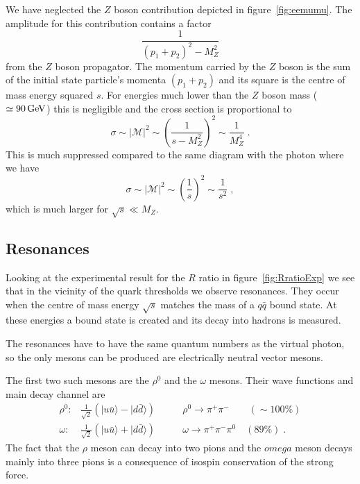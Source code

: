 \documentclass[12pt]{article}
\begin{document}
We have neglected the $Z$ boson contribution depicted in figure~\ref{fig:eemumu}. The amplitude for this contribution contains a factor
\[\frac{1}{(p_1+p_2)^2-M_Z^2}\]
from the $Z$ boson propagator. The momentum carried by the $Z$ boson is the sum of the initial state particle's momenta $(p_1+p_2)$ and its square is the centre of mass energy squared $s$. For energies much lower than the $Z$ boson mass ($\simeq 90\,{\rm GeV}$) this is negligible and the cross section is proportional to 
\[\sigma \sim |\mathcal{M}|^2 \sim \left(\frac{1}{s-M_Z^2}\right)^2  \sim \frac{1}{M_Z^4}\;.\]
This is much suppressed compared to the same diagram with the photon where we have
\[\sigma \sim |\mathcal{M}|^2 \sim \left(\frac{1}{s}\right)^2  \sim \frac{1}{s^2}\;,\]
which is much larger for $\sqrt{s}\ll M_Z$.
\subsection{Resonances}
Looking at the experimental result for the $R$ ratio in figure~\ref{fig:RratioExp} we see that in the vicinity of the quark thresholds we observe resonances. They occur when the centre of mass energy $\sqrt{s}$ matches the mass of a $q\bar q$ bound state. At these energies a bound state is created and its decay into hadrons is measured.

The resonances have to have the same quantum numbers as the virtual photon, so the only mesons can be produced are electrically neutral vector mesons.   

The first two such mesons are the $\rho^0$ and the $\omega$ mesons. Their wave functions and main decay channel are
\begin{eqnarray*}
\rho^0:& \frac{1}{\sqrt{2}}\left(|u\bar u \rangle -|d\bar d \rangle \right)&
\qquad\rho^0\rightarrow \pi^+\pi^- \quad\quad(\sim 100\%)\\ 
\omega :& \frac{1}{\sqrt{2}}\left(|u\bar u \rangle +|d\bar d \rangle \right)&\qquad \omega \rightarrow \pi^+\pi^-\pi^0\quad(89\%)\;. 
\end{eqnarray*} 
The fact that the $\rho$ meson can decay into two pions and the $omega$ meson decays mainly into three pions is a consequence of isospin conservation of the strong force.
\end{document}
